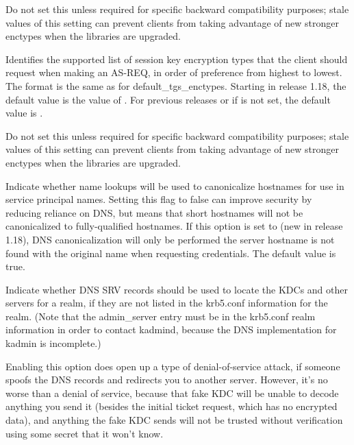 \documentclass[letterpaper,10pt,english]{sphinxmanual}
\begin{document}
\begin{description}
Do not set this unless required for specific backward
compatibility purposes; stale values of this setting can prevent
clients from taking advantage of new stronger enctypes when the
libraries are upgraded.

\item[{\sphinxstylestrong{default\_tkt\_enctypes}}] \leavevmode
Identifies the supported list of session key encryption types that
the client should request when making an AS-REQ, in order of
preference from highest to lowest.  The format is the same as for
default\_tgs\_enctypes.  Starting in release 1.18, the default
value is the value of .  For previous
releases or if  is not set, the default
value is .

Do not set this unless required for specific backward
compatibility purposes; stale values of this setting can prevent
clients from taking advantage of new stronger enctypes when the
libraries are upgraded.

\item[{\sphinxstylestrong{dns\_canonicalize\_hostname}}] \leavevmode
Indicate whether name lookups will be used to canonicalize
hostnames for use in service principal names.  Setting this flag
to false can improve security by reducing reliance on DNS, but
means that short hostnames will not be canonicalized to
fully-qualified hostnames.  If this option is set to  (new
in release 1.18), DNS canonicalization will only be performed the
server hostname is not found with the original name when
requesting credentials.  The default value is true.

\item[{\sphinxstylestrong{dns\_lookup\_kdc}}] \leavevmode
Indicate whether DNS SRV records should be used to locate the KDCs
and other servers for a realm, if they are not listed in the
krb5.conf information for the realm.  (Note that the admin\_server
entry must be in the krb5.conf realm information in order to
contact kadmind, because the DNS implementation for kadmin is
incomplete.)

Enabling this option does open up a type of denial-of-service
attack, if someone spoofs the DNS records and redirects you to
another server.  However, it’s no worse than a denial of service,
because that fake KDC will be unable to decode anything you send
it (besides the initial ticket request, which has no encrypted
data), and anything the fake KDC sends will not be trusted without
verification using some secret that it won’t know.


\end{description}
\end{document}
